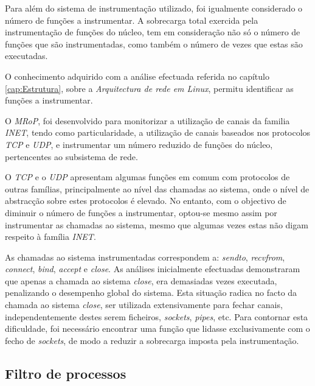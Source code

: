 Para além do sistema de instrumentação utilizado, foi igualmente considerado o número de funções a instrumentar.
A sobrecarga total exercida pela instrumentação de funções do núcleo, tem em consideração não só o número de funções que são instrumentadas, como também o número de vezes que estas são executadas.

O conhecimento adquirido com a análise efectuada referida no capítulo \ref{cap:Estrutura}, sobre a \textit{Arquitectura de rede em Linux}, permitu identificar as funções a instrumentar.

O \textit{MRoP}, foi desenvolvido para monitorizar a utilização de canais da familia \textit{INET}, tendo como particularidade, a utilização de canais baseados nos protocolos \textit{TCP} e \textit{UDP}, e instrumentar um número reduzido de funções do núcleo, pertencentes ao subsistema de rede.

O \textit{TCP} e o \textit{UDP} apresentam algumas funções em comum com protocolos de outras famílias, principalmente ao nível das chamadas ao sistema, onde o nível de abstracção sobre estes protocolos é elevado.
No entanto, com o objectivo de diminuir o número de funções a instrumentar, optou-se mesmo assim por instrumentar as chamadas ao sistema, mesmo que algumas vezes estas não digam respeito à família \textit{INET}.

As chamadas ao sistema instrumentadas correspondem a: \textit{sendto}, \textit{recvfrom}, \textit{connect}, \textit{bind}, \textit{accept} e \textit{close}.
As análises inicialmente efectuadas demonstraram que apenas a chamada ao sistema \textit{close}, era demasiadas vezes executada, penalizando o desempenho global do sistema.
Esta situação radica no facto da chamada ao sistema \textit{close}, ser utilizada extensivamente para fechar canais, independentemente destes serem ficheiros, \textit{sockets}, \textit{pipes}, etc.
Para contornar esta dificuldade, foi necessário encontrar uma função que lidasse exclusivamente com o fecho de \textit{sockets}, de modo a reduzir a sobrecarga imposta pela instrumentação.



\subsection{Filtro de processos}


